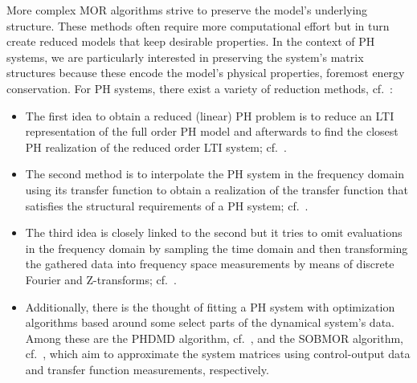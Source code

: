 More complex MOR algorithms strive to preserve the model's underlying structure.
These methods often require more computational effort but in turn create reduced models that keep desirable properties.
In the context of \ac{PH} systems, we are particularly interested in preserving the system's matrix structures because these encode the model's physical properties, foremost energy conservation.
For \ac{PH} systems, there exist a variety of reduction methods, cf.~\cite{Polyuga2010}:
\begin{itemize}
    \item The first idea to obtain a reduced (linear) \ac{PH} problem is to reduce an \ac{LTI} representation of the full order \ac{PH} model and afterwards to find the closest \ac{PH} realization of the reduced order \ac{LTI} system; cf.~\cite{Gillis2018, Cherifi2019}.
    \item The second method is to interpolate the \ac{PH} system in the frequency domain using its transfer function to obtain a realization of the transfer function that satisfies the structural requirements of a \ac{PH} system; cf.~\cite{BGD2020, Schwerdtner2021, Poussot2023}.
    \item The third idea is closely linked to the second but it tries to omit evaluations in the frequency domain by sampling the time domain and then transforming the gathered data into frequency space measurements by means of discrete Fourier and Z-transforms; cf.~\cite{Najnudel2021, Cherifi2022, Günther2023}.
    \item Additionally, there is the thought of fitting a \ac{PH} system with optimization algorithms based around some select parts of the dynamical system's data.
        Among these are the \ac{PHDMD} algorithm, cf.~\cite{Morandin2023}, and the SOBMOR algorithm, cf.~\cite{SV2023}, which aim to approximate the system matrices using control-output data and transfer function measurements, respectively.
\end{itemize}

